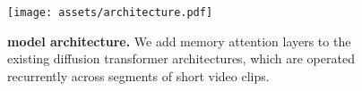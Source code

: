 \begin{figure}[t!]
    \centering    
    \texttt{[image: assets/architecture.pdf]}
    \vspace{-0.1in}
    \caption{\textbf{\sname model architecture.} We add memory attention layers to the existing diffusion transformer architectures, which are operated recurrently across segments of short video clips.}
    \label{fig:model}
\end{figure}